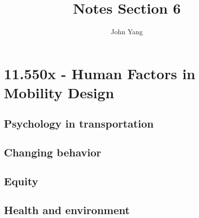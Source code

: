 \documentclass{article}
\title{Notes Section 6} %
\author{John Yang}
\begin{document}
    \maketitle
    \tableofcontents
    \section{11.550x - Human Factors in Mobility Design}
    \subsection{Psychology in transportation}
    \begin{outline}
        \1 
    \end{outline}
    \subsection{Changing behavior}
    \begin{outline}
        \1 
    \end{outline}
    \subsection{Equity}
    \begin{outline}
        \1 
    \end{outline}
    \subsection{Health and environment}
    \begin{outline}
        \1 
    \end{outline}
\end{document}

